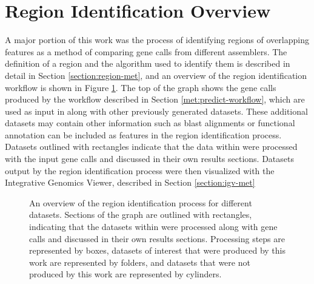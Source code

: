 \section{Region Identification Overview}
\label{section:region-overview}
A major portion of this work was the process of identifying regions of
overlapping features as a method of comparing gene calls from
different assemblers. The definition of a region and the algorithm
used to identify them is described in detail in Section
\ref{section:region-met}, and an overview of the region identification
workflow is shown in Figure \ref{fig:region-overview}. The top of the
graph shows the gene calls produced by the workflow described in
Section \ref{met:predict-workflow}, which are used as input in along
with other previously generated datasets. These additional datasets
may contain other information such as blast alignments or functional
annotation can be included as features in the region identification
process. Datasets outlined with rectangles indicate that the data
within were processed with the input gene calls and discussed in their
own results sections. Datasets output by the region identification
process were then visualized with the Integrative Genomics Viewer,
described in Section \ref{section:igv-met}

\begin{figure}
  \centering
  \caption{An overview of the region identification process for
    different datasets. Sections of the graph are outlined with
    rectangles, indicating that the datasets within were processed
    along with gene calls and discussed in their own results
    sections. Processing steps are represented by boxes, datasets of
    interest that were produced by this work are represented by
    folders, and datasets that were not produced by this work are
    represented by cylinders.}
  \label{fig:region-overview}
\end{figure}


